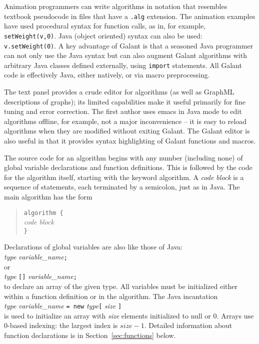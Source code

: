 Animation programmers can write algorithms in notation that resembles
textbook pseudocode
in files that have a \texttt{.alg} extension.
The animation examples have used procedural syntax for function calls, as in, for example,
\texttt{setWeight(v,0)}.
Java (object oriented) syntax can also be used: \texttt{v.setWeight(0)}.
A key advantage of Galant is that a seasoned Java programmer can
not only use the Java syntax but can also augment Galant algorithms with
arbitrary Java classes defined externally, using \texttt{import} statements.
All Galant code is effectively Java, either natively, or via macro preprocessing.

The text panel provides a crude editor for algorithms (as well as GraphML
descriptions of graphs);
its limited capabilities make it useful primarily for fine tuning and error correction.
The first author uses emacs in Java mode to edit algorithms offline, for example,
not a major inconvenience -- it is easy to reload algorithms when they are modified
without exiting Galant.
The Galant editor is also useful in that it provides syntax highlighting of Galant
functions and macros.

The source code for an algorithm begins with any number (including none)
of global variable declarations and function definitions.
This is followed by the code for the algorithm itself, starting with the keyword
\textsf{algorithm}.
A \emph{code block}
is a sequence of statements, each terminated by a semicolon, just as in
Java.
The main algorithm has the form
\begin{quote}
\texttt{algorithm \{}\\
\hspace*{2em}\emph{code block}\\
\texttt{\}}
\end{quote}

Declarations of global variables are also like those of Java:\\
\hspace*{1em}\emph{type} \emph{variable\_name}\texttt{;}\\
or\\
\hspace*{1em}\emph{type} \texttt{[]} \emph{variable\_name}\texttt{;}\\
to declare an array of the given type.
All variables must be initialized either within a function definition or
in the algorithm.
The Java incantation\\
\hspace*{1em}\emph{type} \emph{variable\_name}
\texttt{= new} \emph{type}\texttt{[} \emph{size} \texttt{]}\\
is used to initialize an array with \emph{size} elements initialized to \textsf{null}
or 0.
Arrays use 0-based indexing: the largest index is $\mathit{size} - 1$.
Detailed
information about function declarations is in Section~\ref{sec:functions}
below.

